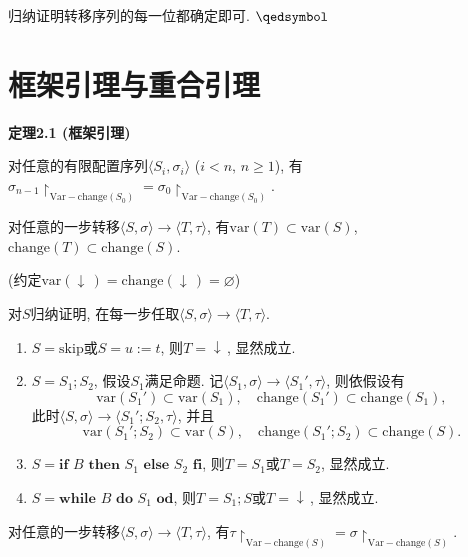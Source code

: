 \documentclass[UTF8]{ctexart}
\begin{document}
归纳证明转移序列的每一位都确定即可. \hfill $\qedsymbol$





\newpage

\section{框架引理与重合引理}

\hypertarget{sec:定理2.1}{}
\noindent\textbf{定理2.1 (框架引理)}

对任意的有限配置序列$\langle S_i,\sigma_i\rangle$ ($i<n,\,n\geqslant 1$), 有
$\sigma_{n-1}\!\restriction_{\mathrm{Var}-\mathrm{change}(S_0)}=
\sigma_0\!\restriction_{\mathrm{Var}-\mathrm{change}(S_0)}$.


\vspace{1pt}\hspace{-1em}
对任意的一步转移$\langle S,\sigma\rangle\to\langle T,\tau\rangle$,
有$\mathrm{var}(T)\subset\mathrm{var}(S)$,
$\mathrm{change}(T)\subset\mathrm{change}(S)$.

(约定$\mathrm{var}(\downarrow\,)=\mathrm{change}(\downarrow\,)=\varnothing$)

\vspace{3pt}
对$S$归纳证明, 在每一步任取$\langle S,\sigma\rangle\to\langle T,\tau\rangle$.
\begin{enumerate}
    \item $S=\mathrm{skip}$或$S=u:=t$, 则$T=\downarrow\,$, 显然成立.
    \item $S=S_1;S_2$, 假设$S_1$满足命题. 记$\langle S_1,\sigma\rangle\to
    \langle S_1',\tau\rangle$, 则依假设有
    \[
        \mathrm{var}(S_1')\subset\mathrm{var}(S_1),\quad
        \mathrm{change}(S_1')\subset\mathrm{change}(S_1),
    \]
    此时$\langle S,\sigma\rangle\to\langle S_1';S_2,\tau\rangle$, 并且
    \[
        \mathrm{var}(S_1';S_2)\subset\mathrm{var}(S),\quad
        \mathrm{change}(S_1';S_2)\subset\mathrm{change}(S).
    \]
    \item $S=\mathbf{if}\,\,B\,\,\mathbf{then}\,\,S_1\,\,\mathbf{else}\,\,
    S_2\,\,\mathbf{fi}$, 则$T=S_1$或$T=S_2$, 显然成立.
    \item $S=\mathbf{while}\,\,B\,\,\mathbf{do}\,\,S_1\,\,\mathbf{od}$,
    则$T=S_1;S$或$T=\downarrow\,$, 显然成立.
\end{enumerate}

\vspace{5pt}\hspace{-1em}
对任意的一步转移$\langle S,\sigma\rangle\to\langle T,\tau\rangle$,
有$\tau\!\restriction_{\mathrm{Var}-\mathrm{change}(S)}=
\sigma\!\restriction_{\mathrm{Var}-\mathrm{change}(S)}$.
\end{document}
